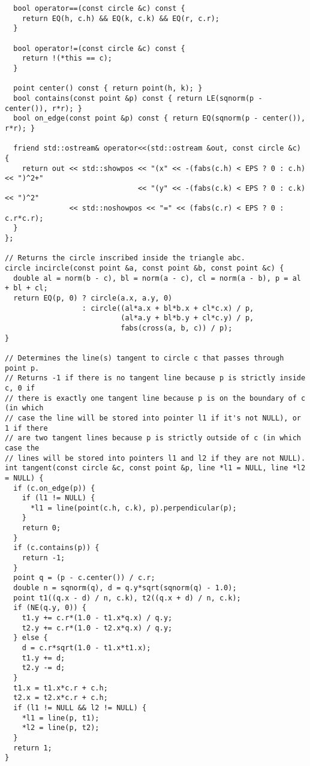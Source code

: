 \begin{lstlisting}
  bool operator==(const circle &c) const {
    return EQ(h, c.h) && EQ(k, c.k) && EQ(r, c.r);
  }

  bool operator!=(const circle &c) const {
    return !(*this == c);
  }

  point center() const { return point(h, k); }
  bool contains(const point &p) const { return LE(sqnorm(p - center()), r*r); }
  bool on_edge(const point &p) const { return EQ(sqnorm(p - center()), r*r); }

  friend std::ostream& operator<<(std::ostream &out, const circle &c) {
    return out << std::showpos << "(x" << -(fabs(c.h) < EPS ? 0 : c.h) << ")^2+"
                               << "(y" << -(fabs(c.k) < EPS ? 0 : c.k) << ")^2"
               << std::noshowpos << "=" << (fabs(c.r) < EPS ? 0 : c.r*c.r);
  }
};

// Returns the circle inscribed inside the triangle abc.
circle incircle(const point &a, const point &b, const point &c) {
  double al = norm(b - c), bl = norm(a - c), cl = norm(a - b), p = al + bl + cl;
  return EQ(p, 0) ? circle(a.x, a.y, 0)
                  : circle((al*a.x + bl*b.x + cl*c.x) / p,
                           (al*a.y + bl*b.y + cl*c.y) / p,
                           fabs(cross(a, b, c)) / p);
}

// Determines the line(s) tangent to circle c that passes through point p.
// Returns -1 if there is no tangent line because p is strictly inside c, 0 if
// there is exactly one tangent line because p is on the boundary of c (in which
// case the line will be stored into pointer l1 if it's not NULL), or 1 if there
// are two tangent lines because p is strictly outside of c (in which case the
// lines will be stored into pointers l1 and l2 if they are not NULL).
int tangent(const circle &c, const point &p, line *l1 = NULL, line *l2 = NULL) {
  if (c.on_edge(p)) {
    if (l1 != NULL) {
      *l1 = line(point(c.h, c.k), p).perpendicular(p);
    }
    return 0;
  }
  if (c.contains(p)) {
    return -1;
  }
  point q = (p - c.center()) / c.r;
  double n = sqnorm(q), d = q.y*sqrt(sqnorm(q) - 1.0);
  point t1((q.x - d) / n, c.k), t2((q.x + d) / n, c.k);
  if (NE(q.y, 0)) {
    t1.y += c.r*(1.0 - t1.x*q.x) / q.y;
    t2.y += c.r*(1.0 - t2.x*q.x) / q.y;
  } else {
    d = c.r*sqrt(1.0 - t1.x*t1.x);
    t1.y += d;
    t2.y -= d;
  }
  t1.x = t1.x*c.r + c.h;
  t2.x = t2.x*c.r + c.h;
  if (l1 != NULL && l2 != NULL) {
    *l1 = line(p, t1);
    *l2 = line(p, t2);
  }
  return 1;
}


\end{lstlisting}
